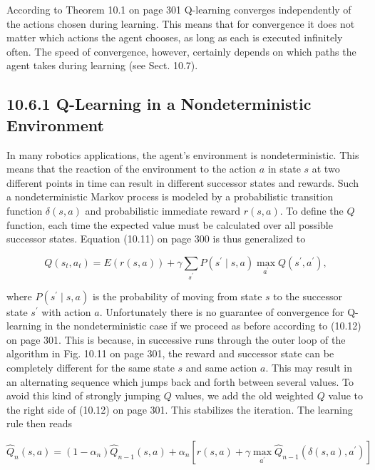 \documentclass[10pt]{book}
\begin{document}
\begin{center}
\begin{enumerate}
\begin{center}
\begin{center}
\begin{center}
\begin{center}
\begin{center}
According to Theorem 10.1 on page 301 Q-learning converges independently of the actions chosen during learning. This means that for convergence it does not matter which actions the agent chooses, as long as each is executed infinitely often. The speed of convergence, however, certainly depends on which paths the agent takes during learning (see Sect. 10.7).

\subsection*{10.6.1 Q-Learning in a Nondeterministic Environment}
In many robotics applications, the agent's environment is nondeterministic. This means that the reaction of the environment to the action $a$ in state $s$ at two different points in time can result in different successor states and rewards. Such a nondeterministic Markov process is modeled by a probabilistic transition function $\delta(s, a)$ and probabilistic immediate reward $r(s, a)$. To define the $Q$ function, each time the expected value must be calculated over all possible successor states. Equation (10.11) on page 300 is thus generalized to


\begin{equation*}
Q\left(s_{t}, a_{t}\right)=E(r(s, a))+\gamma \sum_{s^{\prime}} P\left(s^{\prime} \mid s, a\right) \max _{a^{\prime}} Q\left(s^{\prime}, a^{\prime}\right), \tag{10.13}
\end{equation*}


where $P\left(s^{\prime} \mid s, a\right)$ is the probability of moving from state $s$ to the successor state $s^{\prime}$ with action $a$. Unfortunately there is no guarantee of convergence for Q-learning in the nondeterministic case if we proceed as before according to (10.12) on page 301. This is because, in successive runs through the outer loop of the algorithm in Fig. 10.11 on page 301, the reward and successor state can be completely different for the same state $s$ and same action $a$. This may result in an alternating sequence which jumps back and forth between several values. To avoid this kind of strongly jumping $Q$ values, we add the old weighted $Q$ value to the right side of (10.12) on page 301. This stabilizes the iteration. The learning rule then reads


\begin{equation*}
\hat{Q}_{n}(s, a)=\left(1-\alpha_{n}\right) \hat{Q}_{n-1}(s, a)+\alpha_{n}\left[r(s, a)+\gamma \max _{a^{\prime}} \hat{Q}_{n-1}\left(\delta(s, a), a^{\prime}\right)\right] \tag{10.14}
\end{equation*}



\end{center}
\end{center}
\end{center}
\end{center}
\end{center}
\end{enumerate}
\end{center}
\end{document}
